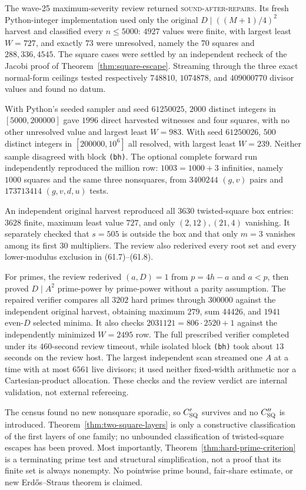 \documentclass[10pt,reqno]{amsart}
\theoremstyle{definition}
\newcommand{\1}{\mathbf 1}
\begin{document}
The wave-25 maximum-severity review returned
\textsc{sound-after-repairs}.  Its fresh Python-integer implementation used
only the original $D\mid((M+1)/4)^2$ harvest and classified every
$n\leq5000$: $4927$ values were finite, with largest least $W=727$, and
exactly $73$ were unresolved, namely the $70$ squares and
$288,336,4545$.  The square cases were settled by an independent recheck of
the Jacobi proof of Theorem~\ref{thm:square-escape}.  Streaming through the
three exact normal-form ceilings tested respectively $748810$, $1074878$,
and $409000770$ divisor values and found no datum.

With Python's seeded sampler and seed $61250025$, $2000$ distinct integers
in $[5000,200000]$ gave $1996$ direct harvested witnesses and four squares,
with no other unresolved value and largest least $W=983$.  With seed
$61250026$, $500$ distinct integers in $[200000,10^6]$ all resolved, with
largest least $W=239$.  Neither sample disagreed with block \texttt{(bh)}.
The optional complete forward run independently reproduced the million row:
$1003=1000+3$ infinities, namely $1000$ squares and the same three
nonsquares, from $3400244$ $(g,v)$ pairs and $173713414$ $(g,v,d,u)$ tests.

An independent original harvest reproduced all $3630$ twisted-square box
entries: $3628$ finite, maximum least value $727$, and only
$(2,12),(21,4)$ vanishing.  It separately checked that $s=505$ is outside
the box and that only $m=3$ vanishes among its first $30$ multipliers.  The
review also rederived every root set and every lower-modulus exclusion in
(61.7)--(61.8).

For primes, the review rederived $(a,D)=1$ from $p=4h-a$ and $a<p$, then
proved $D\mid A^2$ prime-power by prime-power without a parity assumption.
The repaired verifier compares all $3202$ hard primes through $300000$
against the independent original harvest, obtaining maximum $279$, sum
$44426$, and $1941$ even-$D$ selected minima.  It also checks
$2031121=806\cdot2520+1$ against the independently minimized $W=2495$ row.
The full prescribed verifier completed under its $460$-second review
timeout, while isolated block \texttt{(bh)} took about $13$ seconds on the
review host.  The largest independent scan streamed one $A$ at a time with at
most $6561$ live divisors; it used neither fixed-width arithmetic nor a
Cartesian-product allocation.  These checks and the review verdict are
internal validation, not external refereeing.

The census found no new nonsquare sporadic, so $C_{\rm SQ}'$ survives and
no $C_{\rm SQ}''$ is introduced.  Theorem~\ref{thm:two-square-layers} is
only a constructive classification of the first layers of one family; no
unbounded classification of twisted-square escapes has been proved.  Most
importantly, Theorem~\ref{thm:hard-prime-criterion} is a terminating prime
test and structural simplification, not a proof that its finite set is
always nonempty.  No pointwise prime bound, fair-share estimate, or new
Erd\H{o}s--Straus theorem is claimed.
\end{document}

